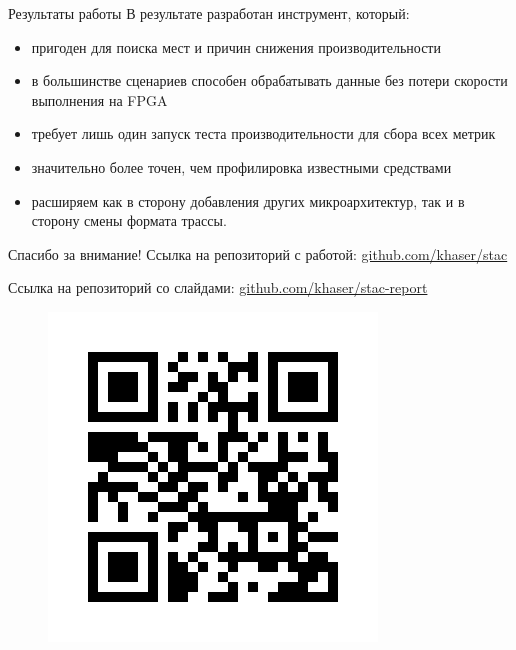 \documentclass[10pt,aspectratio=169,hyperref={pdftex,unicode},xcolor=dvipsnames]{beamer}
\begin{document}
\begin{frame}{ Результаты работы }
    В результате разработан инструмент, который:
    \begin{itemize}
        \item
        пригоден для поиска мест и причин снижения производительности
        \pause \item
        в большинстве сценариев способен обрабатывать данные
        без потери скорости выполнения на FPGA
        \pause \item
        требует лишь один запуск теста производительности для
        сбора всех метрик
        \pause \item
        значительно более точен, чем профилировка известными
        средствами
        \pause \item
        расширяем как в сторону добавления других микроархитектур,
        так и в сторону смены формата трассы.
    \end{itemize}
\end{frame}

\begin{frame}{ Спасибо за внимание! }
    Ссылка на репозиторий с работой: \href{https://github.com/khaser/stac}{github.com/khaser/stac}

    Ссылка на репозиторий со слайдами: \href{https://github.com/khaser/stac}{github.com/khaser/stac-report}

    \begin{figure}
        \centering
        \includegraphics[height=0.8\textheight,keepaspectratio]{./images/stac_qr.png}
    \end{figure}
\end{frame}
\end{document}
